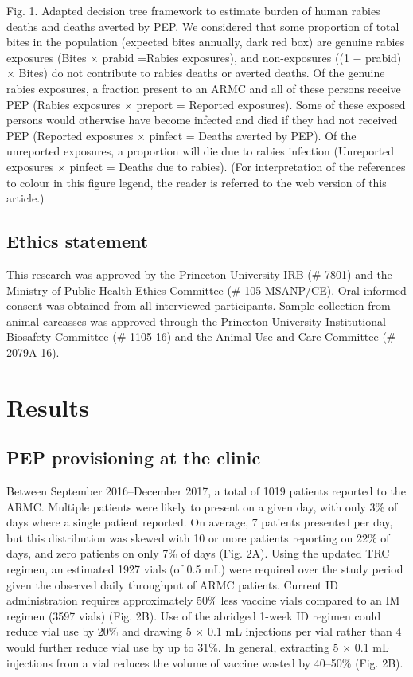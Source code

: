 \documentclass[
]{book}
\begin{document}
Fig. 1. Adapted decision tree framework to estimate burden of human rabies deaths and deaths averted by PEP. We considered that some proportion of total bites in the population (expected bites annually, dark red box) are genuine rabies exposures (Bites × prabid =Rabies exposures), and non-exposures ((1 − prabid) × Bites) do not contribute to rabies deaths or averted deaths. Of the genuine rabies exposures, a fraction present to an ARMC and all of these persons receive PEP (Rabies exposures × preport = Reported exposures). Some of these exposed persons would otherwise have become infected and died if they had not received PEP (Reported exposures × pinfect = Deaths averted by PEP). Of the unreported exposures, a proportion will die due to rabies infection (Unreported exposures × pinfect = Deaths due to rabies). (For interpretation of the references to colour in this figure legend, the reader is referred to the web version of this article.)

\hypertarget{ethics-statement}{%
\subsection{Ethics statement}\label{ethics-statement}}

This research was approved by the Princeton University IRB (\# 7801) and the Ministry of Public Health Ethics Committee (\# 105-MSANP/CE). Oral informed consent was obtained from all interviewed participants. Sample collection from animal carcasses was approved through the Princeton University Institutional Biosafety Committee (\# 1105-16) and the Animal Use and Care Committee (\# 2079A-16).

\hypertarget{results}{%
\section{Results}\label{results}}

\hypertarget{pep-provisioning-at-the-clinic}{%
\subsection{PEP provisioning at the clinic}\label{pep-provisioning-at-the-clinic}}

Between September 2016--December 2017, a total of 1019 patients reported to the ARMC. Multiple patients were likely to present on a given day, with only 3\% of days where a single patient reported. On average, 7 patients presented per day, but this distribution was skewed with 10 or more patients reporting on 22\% of days, and zero patients on only 7\% of days (Fig. 2A). Using the updated TRC regimen, an estimated 1927 vials (of 0.5 mL) were required over the study period given the observed daily throughput of ARMC patients. Current ID administration requires approximately 50\% less vaccine vials compared to an IM regimen (3597 vials) (Fig. 2B). Use of the abridged 1-week ID regimen could reduce vial use by 20\% and drawing 5 × 0.1 mL injections per vial rather than 4 would further reduce vial use by up to 31\%. In general, extracting 5 × 0.1 mL injections from a vial reduces the volume of vaccine wasted by 40--50\% (Fig. 2B).
\end{document}
